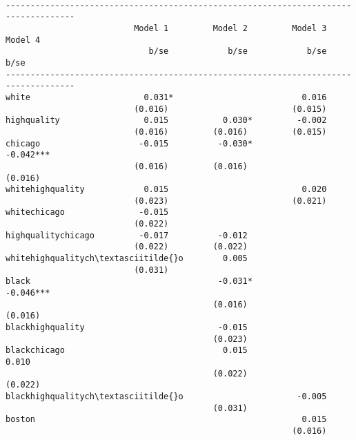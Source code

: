 \documentclass[11pt,notitlepage]{article}\usepackage[]{graphicx}\usepackage[]{color}
\makeatletter
\newenvironment{kframe}{%
 \def\at@end@of@kframe{}%
 \ifinner\ifhmode%
  \def\at@end@of@kframe{\end{minipage}}%
  \begin{minipage}{\columnwidth}%
 \fi\fi%
 \def\FrameCommand##1{\hskip\@totalleftmargin \hskip-\fboxsep
 \colorbox{shadecolor}{##1}\hskip-\fboxsep
     \hskip-\linewidth \hskip-\@totalleftmargin \hskip\columnwidth}%
 \MakeFramed {\advance\hsize-\width
   \@totalleftmargin\z@ \linewidth\hsize
   \@setminipage}}%
 {\par\unskip\endMakeFramed%
 \at@end@of@kframe}
\newenvironment{knitrout}{}{} %
\makeatother
\begin{document}
\begin{enumerate}[a)]
\begin{knitrout}
\begin{kframe}
\begin{footnotesize}


    \begin{Verbatim}[commandchars=\\\{\}]

------------------------------------------------------------------------------------
                          Model 1         Model 2         Model 3         Model 4   
                             b/se            b/se            b/se            b/se   
------------------------------------------------------------------------------------
white                       0.031*                          0.016                   
                          (0.016)                         (0.015)                   
highquality                 0.015           0.030*         -0.002                   
                          (0.016)         (0.016)         (0.015)                   
chicago                    -0.015          -0.030*                         -0.042***
                          (0.016)         (0.016)                         (0.016)   
whitehighquality            0.015                           0.020                   
                          (0.023)                         (0.021)                   
whitechicago               -0.015                                                   
                          (0.022)                                                   
highqualitychicago         -0.017          -0.012                                   
                          (0.022)         (0.022)                                   
whitehighqualitych\textasciitilde{}o        0.005                                                   
                          (0.031)                                                   
black                                      -0.031*                         -0.046***
                                          (0.016)                         (0.016)   
blackhighquality                           -0.015                                   
                                          (0.023)                                   
blackchicago                                0.015                           0.010   
                                          (0.022)                         (0.022)   
blackhighqualitych\textasciitilde{}o                       -0.005                                   
                                          (0.031)                                   
boston                                                      0.015                   
                                                          (0.016)                   

\end{Verbatim}
\end{footnotesize}
\end{kframe}
\end{knitrout}
\end{enumerate}
\end{document}
